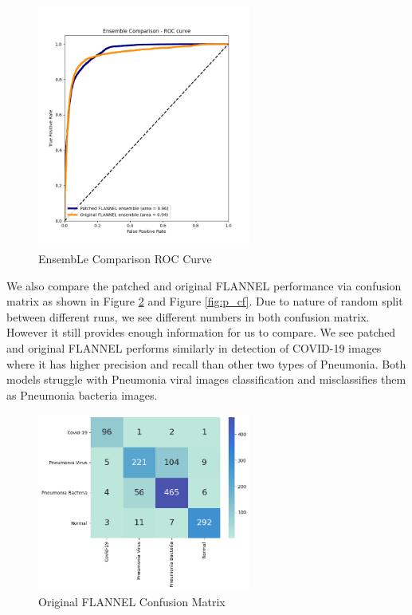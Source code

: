 \documentclass{sigkddExp}
\begin{document}
\begin{figure}[h]
    \centering
    \includegraphics[width=7cm]{../doc/images/ensemble_comparison_roc_curve.png}
    \caption{EnsembLe Comparison ROC Curve}
    \label{fig:ec_roccurve}
\end{figure}

We also compare the patched and original FLANNEL performance via confusion
matrix as shown in Figure \ref{fig:f_cf} and Figure \ref{fig:p_cf}. Due to
nature of random split between different runs, we see different numbers in both
confusion matrix. However it still provides enough information for us to compare.
We see patched and original FLANNEL performs similarly in detection of COVID-19 images
where it has higher precision and recall than other two types of Pneumonia. Both
models struggle with Pneumonia viral images classification and misclassifies
them as Pneumonia bacteria images.

\begin{figure}[h]
    \centering
    \includegraphics[width=7cm]{../doc/images/base_flannel_cf.png}
    \caption{Original FLANNEL Confusion Matrix}
    \label{fig:f_cf}
\end{figure}
\end{document}
